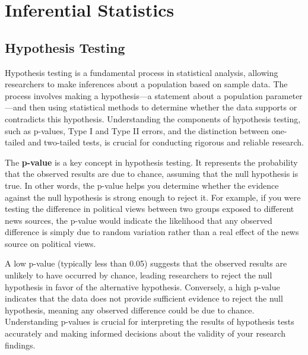 \documentclass[
]{book}
\begin{document}
\section{Inferential Statistics}\label{inferential-statistics}

\subsection{Hypothesis Testing}\label{hypothesis-testing}

Hypothesis testing is a fundamental process in statistical analysis, allowing researchers to make inferences about a population based on sample data. The process involves making a hypothesis---a statement about a population parameter---and then using statistical methods to determine whether the data supports or contradicts this hypothesis. Understanding the components of hypothesis testing, such as p-values, Type I and Type II errors, and the distinction between one-tailed and two-tailed tests, is crucial for conducting rigorous and reliable research.

The \textbf{p-value} is a key concept in hypothesis testing. It represents the probability that the observed results are due to chance, assuming that the null hypothesis is true. In other words, the p-value helps you determine whether the evidence against the null hypothesis is strong enough to reject it. For example, if you were testing the difference in political views between two groups exposed to different news sources, the p-value would indicate the likelihood that any observed difference is simply due to random variation rather than a real effect of the news source on political views.

A low p-value (typically less than 0.05) suggests that the observed results are unlikely to have occurred by chance, leading researchers to reject the null hypothesis in favor of the alternative hypothesis. Conversely, a high p-value indicates that the data does not provide sufficient evidence to reject the null hypothesis, meaning any observed difference could be due to chance. Understanding p-values is crucial for interpreting the results of hypothesis tests accurately and making informed decisions about the validity of your research findings.
\end{document}
